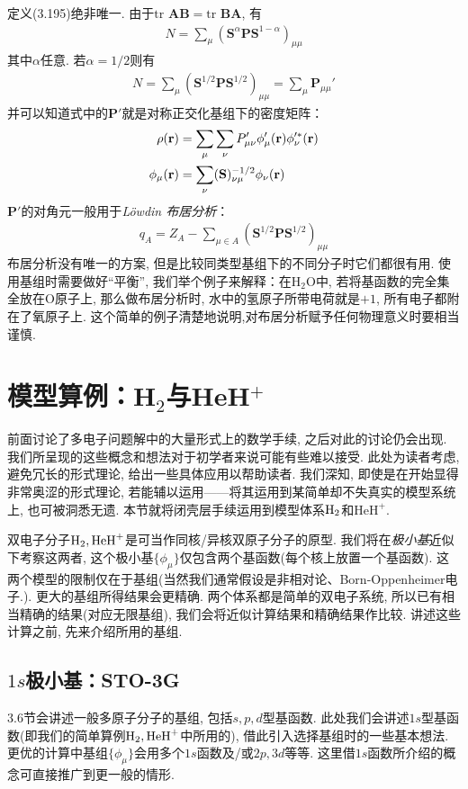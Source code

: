 定义(3.195)绝非唯一. 由于$\mathrm{tr}\,\,\mathbf{AB}=\mathrm{tr}\,\,\mathbf{BA}$, 有
\begin{align}
N = \sum_\mu (\mathbf{S}^\alpha\mathbf{PS}^{1-\alpha})_{\mu\mu}
\end{align}
其中$\alpha$任意. 若$\alpha=1/2$则有
\begin{align}
\label{3.198}
N = \sum_\mu (\mathbf{S}^{1/2}\mathbf{PS}^{1/2})_{\mu\mu} = \sum_\mu \mathbf{P}_{\mu\mu}'
\end{align}
并可以知道式中的$\mathbf{P}'$就是对称正交化基组下的密度矩阵：
\begin{align}
\rho(\mathbf{r}) &= \sum_\mu\sum_\nu P'_{\mu\nu}\phi_\mu'(\mathbf{r})\phi_\nu^{\prime *}(\mathbf{r})\\
\phi_{\mu}(\mathbf{r}) &= \sum_\nu(\mathbf{S})^{-1/2}_{\nu\mu}\phi_\nu(\mathbf{r})
\end{align}
$\mathbf{P}'$的对角元一般用于\emph{L\"owdin 布居分析}：
\begin{align}
q_A = Z_A - \sum_{\mu\in A}(\mathbf{S}^{1/2}\mathbf{PS}^{1/2})_{\mu\mu}
\end{align}
布居分析没有唯一的方案, 但是比较同类型基组下的不同分子时它们都很有用. 使用基组时需要做好``平衡'', 我们举个例子来解释：在$\mathrm{H}_2\mathrm{O}$中, 若将基函数的完全集全放在$\mathrm{O}$原子上, 那么做布居分析时, 水中的氢原子所带电荷就是$+1$, 所有电子都附在了氧原子上. 这个简单的例子清楚地说明,对布居分析赋予任何物理意义时要相当谨慎.
\section{模型算例：H$_2$与HeH$^+$}
前面讨论了多电子问题解中的大量形式上的数学手续, 之后对此的讨论仍会出现. 我们所呈现的这些概念和想法对于初学者来说可能有些难以接受. 此处为读者考虑, 避免冗长的形式理论, 给出一些具体应用以帮助读者. 我们深知, 即使是在开始显得非常奥涩的形式理论, 若能辅以运用——将其运用到某简单却不失真实的模型系统上, 也可被洞悉无遗. 本节就将闭壳层\hft 手续运用到模型体系$\mathrm{H}_2$和$\mathrm{HeH}^+$.

双电子分子$\mathrm{H}_2,\mathrm{HeH}^+$是可当作同核/异核双原子分子的原型. 我们将在\emph{极小基}近似下考察这两者, 这个极小基$\{\phi_\mu\}$仅包含两个基函数(每个核上放置一个基函数). 这两个模型的限制仅在于基组(当然我们通常假设是非相对论、Born-Oppenheimer电子\ha.). 更大的基组所得结果会更精确. 两个体系都是简单的双电子系统, 所以已有相当精确的结果(对应无限基组), 我们会将近似计算结果和精确结果作比较. 讲述这些计算之前, 先来介绍所用的基组.
\subsection{$1s$极小基：STO-3G}
\label{sec3.5.1}
3.6节会讲述一般多原子分子的基组, 包括$s,p,d$型基函数. 此处我们会讲述$1s$型基函数(即我们的简单算例$\mathrm{H}_2,\mathrm{HeH}^+$中所用的), 借此引入选择基组时的一些基本想法. 更优的计算中基组$\{\phi_\mu\}$会用多个$1s$函数及/或$2p,3d$等等. 这里借$1s$函数所介绍的概念可直接推广到更一般的情形.

